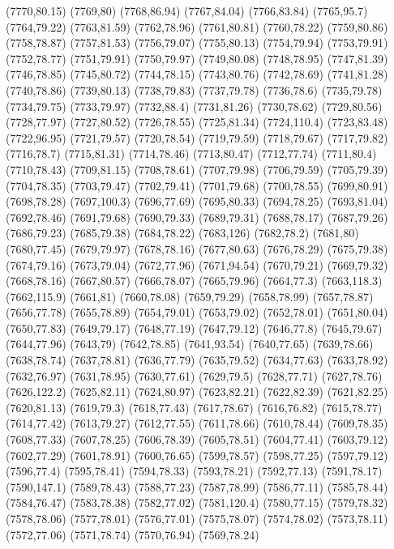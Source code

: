 (7770,80.15)
(7769,80)
(7768,86.94)
(7767,84.04)
(7766,83.84)
(7765,95.7)
(7764,79.22)
(7763,81.59)
(7762,78.96)
(7761,80.81)
(7760,78.22)
(7759,80.86)
(7758,78.87)
(7757,81.53)
(7756,79.07)
(7755,80.13)
(7754,79.94)
(7753,79.91)
(7752,78.77)
(7751,79.91)
(7750,79.97)
(7749,80.08)
(7748,78.95)
(7747,81.39)
(7746,78.85)
(7745,80.72)
(7744,78.15)
(7743,80.76)
(7742,78.69)
(7741,81.28)
(7740,78.86)
(7739,80.13)
(7738,79.83)
(7737,79.78)
(7736,78.6)
(7735,79.78)
(7734,79.75)
(7733,79.97)
(7732,88.4)
(7731,81.26)
(7730,78.62)
(7729,80.56)
(7728,77.97)
(7727,80.52)
(7726,78.55)
(7725,81.34)
(7724,110.4)
(7723,83.48)
(7722,96.95)
(7721,79.57)
(7720,78.54)
(7719,79.59)
(7718,79.67)
(7717,79.82)
(7716,78.7)
(7715,81.31)
(7714,78.46)
(7713,80.47)
(7712,77.74)
(7711,80.4)
(7710,78.43)
(7709,81.15)
(7708,78.61)
(7707,79.98)
(7706,79.59)
(7705,79.39)
(7704,78.35)
(7703,79.47)
(7702,79.41)
(7701,79.68)
(7700,78.55)
(7699,80.91)
(7698,78.28)
(7697,100.3)
(7696,77.69)
(7695,80.33)
(7694,78.25)
(7693,81.04)
(7692,78.46)
(7691,79.68)
(7690,79.33)
(7689,79.31)
(7688,78.17)
(7687,79.26)
(7686,79.23)
(7685,79.38)
(7684,78.22)
(7683,126)
(7682,78.2)
(7681,80)
(7680,77.45)
(7679,79.97)
(7678,78.16)
(7677,80.63)
(7676,78.29)
(7675,79.38)
(7674,79.16)
(7673,79.04)
(7672,77.96)
(7671,94.54)
(7670,79.21)
(7669,79.32)
(7668,78.16)
(7667,80.57)
(7666,78.07)
(7665,79.96)
(7664,77.3)
(7663,118.3)
(7662,115.9)
(7661,81)
(7660,78.08)
(7659,79.29)
(7658,78.99)
(7657,78.87)
(7656,77.78)
(7655,78.89)
(7654,79.01)
(7653,79.02)
(7652,78.01)
(7651,80.04)
(7650,77.83)
(7649,79.17)
(7648,77.19)
(7647,79.12)
(7646,77.8)
(7645,79.67)
(7644,77.96)
(7643,79)
(7642,78.85)
(7641,93.54)
(7640,77.65)
(7639,78.66)
(7638,78.74)
(7637,78.81)
(7636,77.79)
(7635,79.52)
(7634,77.63)
(7633,78.92)
(7632,76.97)
(7631,78.95)
(7630,77.61)
(7629,79.5)
(7628,77.71)
(7627,78.76)
(7626,122.2)
(7625,82.11)
(7624,80.97)
(7623,82.21)
(7622,82.39)
(7621,82.25)
(7620,81.13)
(7619,79.3)
(7618,77.43)
(7617,78.67)
(7616,76.82)
(7615,78.77)
(7614,77.42)
(7613,79.27)
(7612,77.55)
(7611,78.66)
(7610,78.44)
(7609,78.35)
(7608,77.33)
(7607,78.25)
(7606,78.39)
(7605,78.51)
(7604,77.41)
(7603,79.12)
(7602,77.29)
(7601,78.91)
(7600,76.65)
(7599,78.57)
(7598,77.25)
(7597,79.12)
(7596,77.4)
(7595,78.41)
(7594,78.33)
(7593,78.21)
(7592,77.13)
(7591,78.17)
(7590,147.1)
(7589,78.43)
(7588,77.23)
(7587,78.99)
(7586,77.11)
(7585,78.44)
(7584,76.47)
(7583,78.38)
(7582,77.02)
(7581,120.4)
(7580,77.15)
(7579,78.32)
(7578,78.06)
(7577,78.01)
(7576,77.01)
(7575,78.07)
(7574,78.02)
(7573,78.11)
(7572,77.06)
(7571,78.74)
(7570,76.94)
(7569,78.24)
